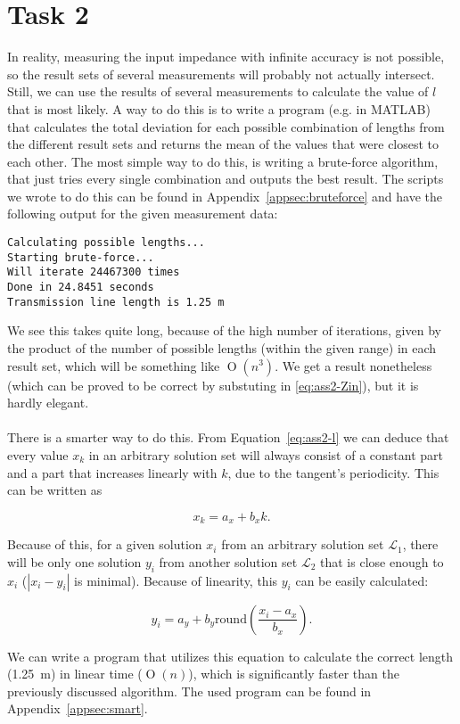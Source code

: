 \documentclass[11pt,titlepage]{report}
\begin{document}
\section{Task 2}
In reality, measuring the input impedance with infinite accuracy is not possible, so the result sets of several measurements will probably not actually intersect.
\\
Still, we can use the results of several measurements to calculate the value of $l$ that is most likely. A way to do this is to write a program (e.g. in MATLAB) that calculates the total deviation for each possible combination of lengths from the different result sets and returns the mean of the values that were closest to each other. The most simple way to do this, is writing a brute-force algorithm, that just tries every single combination and outputs the best result. The scripts we wrote to do this can be found in Appendix~\ref{appsec:bruteforce} and have the following output for the given measurement data:

\begin{verbatim}
Calculating possible lengths...
Starting brute-force...
Will iterate 24467300 times
Done in 24.8451 seconds
Transmission line length is 1.25 m
\end{verbatim}

We see this takes quite long, because of the high number of iterations, given by the product of the number of possible lengths (within the given range) in each result set, which will be something like $\operatorname{O}(n^3)$. We get a result nonetheless (which can be proved to be correct by substuting in \ref{eq:ass2-Zin}), but it is hardly elegant.
\\
\\
There is a smarter way to do this. From Equation~\ref{eq:ass2-l} we can deduce that every value $x_k$ in an arbitrary solution set will always consist of a constant part and a part that increases linearly with $k$, due to the tangent's periodicity. This can be written as

\begin{equation}
	x_k = a_x + b_x k.
\end{equation}

Because of this, for a given solution $x_i$ from an arbitrary solution set $\mathcal{L_1}$, there will be only one solution $y_i$ from another solution set $\mathcal{L_2}$ that is close enough to $x_i$ ($|x_i-y_i|$ is minimal). Because of linearity, this $y_i$ can be easily calculated:

\begin{equation}
	y_i = a_y + b_y \mathrm{round}\left(\frac{x_i-a_x}{b_x}\right).
\end{equation}

We can write a program that utilizes this equation to calculate the correct length (\SI{1.25}{m}) in linear time ($\operatorname{O}(n)$), which is significantly faster than the previously discussed algorithm. The used program can be found in Appendix~\ref{appsec:smart}.
	
\end{document}
